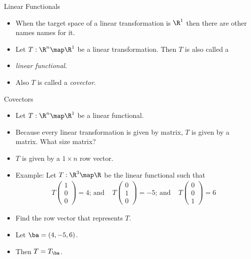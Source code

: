 \documentclass{beamer}
\begin{document}
\begin{frame}{Linear Functionals}
\begin{itemize}
\item When the target space of a linear transformation is $\R^1$ then there
are other names names for it.
\item Let $T:\R^n\map\R^1$ be a linear transformation. Then $T$ is also called a
\item \emph{linear functional}.
\item Also $T$ is called a \emph{covector}.
\end{itemize}
\end{frame}


\begin{frame}{Covectors}
\begin{itemize}
\item Let $T:\R^n\map\R^1$ be a linear functional.
\item Because every linear transformation is given by matrix, $T$ is given
by a matrix. What size matrix?
\item $T$ is given by a $1\times n$ row vector.
\item Example: Let $T:\R^3\map\R$ be the linear functional such that
$$
\begin{matrix}
T\begin{pmatrix} 1 \\ 0 \\ 0  \end{pmatrix} = 4
\text{; and }
&
T\begin{pmatrix} 0 \\ 1 \\ 0  \end{pmatrix} = -5
\text{; and }
&
T \begin{pmatrix} 0 \\ 0 \\ 1  \end{pmatrix} = 6
\end{matrix}
$$
\item Find the row vector that represents $T$.
\item Let $\ba = (4, -5, 6)$.
\item Then $T = T_{\ba}$.
\end{itemize}
\end{frame}

\end{document}
